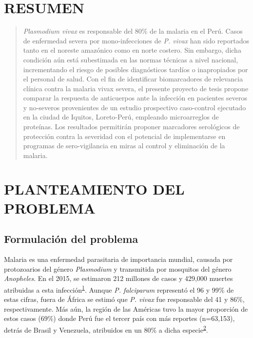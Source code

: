 \documentclass[]{article}
\begin{document}
\vfill
\restoregeometry
\clearpage

\newpage

\tableofcontents

\newpage


\section*{RESUMEN}\label{resumen}

\begin{quote}
\emph{Plasmodium vivax} es responsable del 80\% de la malaria en el
Perú. Casos de enfermedad severa por mono-infecciones de \emph{P. vivax}
han sido reportados tanto en el noreste amazónico como en norte costero.
Sin embargo, dicha condición aún está subestimada en las normas técnicas
a nivel nacional, incrementando el riesgo de posibles diagnósticos
tardíos o inapropiados por el personal de salud. Con el fin de
identificar biomarcadores de relevancia clínica contra la malaria vivax
severa, el presente proyecto de tesis propone comparar la respuesta de
anticuerpos ante la infección en pacientes severos y no-severos
provenientes de un estudio prospectivo caso-control ejecutado en la
ciudad de Iquitos, Loreto-Perú, empleando microarreglos de proteínas.
Los resultados permitirán proponer marcadores serológicos de protección
contra la severidad con el potencial de implementarse en programas de
sero-vigilancia en miras al control y eliminación de la malaria.
\end{quote}

\section{PLANTEAMIENTO DEL PROBLEMA}\label{planteamiento-del-problema}

\subsection{Formulación del problema}\label{intro}

Malaria es una enfermedad parasitaria de importancia mundial, causada
por protozoarios del género \emph{Plasmodium} y transmitida por
mosquitos del género \emph{Anopheles}. En el 2015, se estimaron 212
millones de casos y 429,000 muertes atribuidas a esta
infección\textsuperscript{\protect\hyperlink{ref-WHO2016world}{1}}.
Aunque \emph{P. falciparum} representó el 96 y 99\% de estas cifras,
fuera de África se estimó que \emph{P. vivax} fue responsable del 41 y
86\%, respectivamente. Más aún, la región de las Américas tuvo la mayor
proporción de estos casos (69\%) donde Perú fue el tercer país con más
reportes (n=63,153), detrás de Brasil y Venezuela, atribuidos en un 80\%
a dicha
especie\textsuperscript{\protect\hyperlink{ref-rosas2016peru}{2}}.
\end{document}
